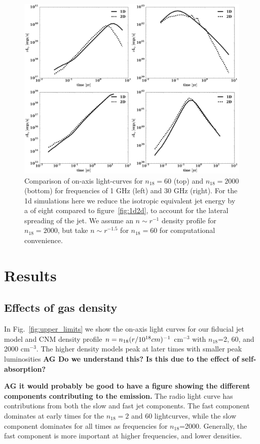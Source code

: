 \documentclass[usenatbib,fleqn]{mnras}
\begin{document}
\begin{figure}
\includegraphics[width=16cm]{1d_2d.pdf}
\caption{\label{fig:1d2dB} Comparison of on-axis light-curves for
  $n_{18}=60$ (top) and $n_{18}=2000$ (bottom) for frequencies of 1
  GHz (left) and 30 GHz (right). For the 1d simulations here we reduce
  the isotropic equivalent jet energy by a of eight compared to
  figure~\ref{fig:1d2d}, to account for the lateral spreading of the
  jet. We assume an $n\sim r^{-1}$ density profile for $n_{18}=2000$, but
  take $n\sim r^{-1.5}$ for $n_{18}=60$ for computational convenience.}
\end{figure}


\section{Results}
\label{sec:results}

\subsection{Effects of gas density}

In Fig.~\ref{fig:upper_limits} we show the on-axis light curves for
our fiducial jet model and CNM density profile $n=n_{18} (r/10^{18}
{\rm} cm)^{-1}$ cm$^{-3}$ with $n_{18}$=2, 60, and 2000 cm$^{-3}$. The
higher density models peak at later times with smaller peak
luminosities {\bf AG Do we understand this? Is this due to the effect
  of self-absorption?}

{\bf AG it would probably be good to have a figure showing the
  different components contributing to the emission.} The radio light
curve has contributions from both the slow and fast jet
components. The fast component dominates at
early times for the $n_{18}=2$ and 60 lightcurves, while the slow
component dominates for all times as frequencies for
$n_{18}$=2000. Generally, the fast component is more important at
higher frequencies, and lower densities.
\end{document}
